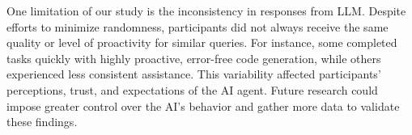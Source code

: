One limitation of our study is the inconsistency in responses from LLM.
Despite efforts to minimize randomness, participants did not always receive the same quality or level of proactivity for similar queries.
For instance, some completed tasks quickly with highly proactive, error-free code generation, while others experienced less consistent assistance. 
This variability affected participants' perceptions, trust, and expectations of the AI agent. 
Future research could impose greater control over the AI's behavior and gather more data to validate these findings.
